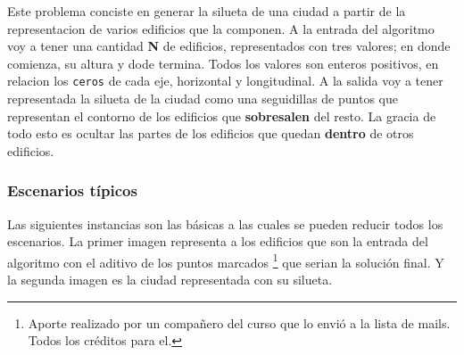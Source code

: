 Este problema conciste en generar la silueta de una ciudad a partir de la representacion de varios edificios que la componen.
A la entrada del algoritmo voy a tener una cantidad \textbf{N} de edificios, representados con tres valores; en donde comienza, su altura y dode termina. Todos los valores son enteros positivos, en relacion los \texttt{ceros} de cada eje, horizontal y longitudinal.
A la salida voy a tener representada la silueta de la ciudad como una seguidillas de puntos que representan el contorno de los edificios que \textbf{sobresalen} del resto.
La gracia de todo esto es ocultar las partes de los edificios que quedan \textbf{dentro} de otros edificios.

\subsubsection*{Escenarios t\'ipicos}

Las siguientes instancias son las b\'asicas a las cuales se pueden reducir todos los escenarios. La primer imagen representa a los edificios que son la entrada del algoritmo con el aditivo de los puntos marcados \footnote{Aporte realizado por un compañero del curso que lo envió a la lista de mails. Todos los créditos para el.} que serian la solución final. Y la segunda imagen es la ciudad representada con su silueta.

